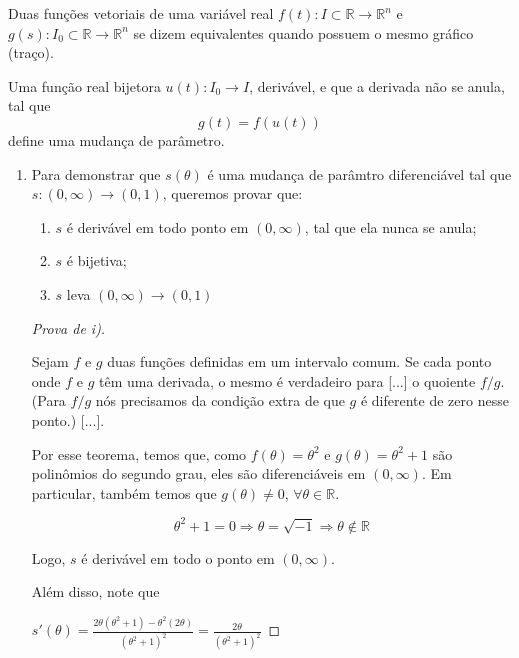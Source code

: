 \documentclass[../main.tex]{subfiles}
\begin{document}
\begin{solucao}
	\begin{definicao} 
		Duas funções vetoriais de uma variável real $f(t) : I\subset \mathbb{R}\rightarrow \mathbb{R}^n$ e $g(s) : I_{0} \subset \mathbb{R} \rightarrow \mathbb{R}^n$ se dizem equivalentes quando possuem o mesmo gráfico (traço).
		
		Uma função real bijetora $u(t) : I_{0}\rightarrow I$, derivável, e que a derivada não se anula, tal que
		$$g(t) = f(u(t))$$
		define uma mudança de parâmetro.
	\end{definicao}
	
	\begin{enumerate}[label=\alph*)]
		\item Para demonstrar que $s(\theta)$ é uma mudança de parâmtro diferenciável tal que $s:(0,\infty)\rightarrow(0,1)$, queremos provar que:
		
		\begin{enumerate}[label=\roman*)]
			\item $s$ é derivável em todo ponto em $(0,\infty)$, tal que ela nunca se anula;
			\item $s$ é bijetiva;
			\item $s$ leva $(0,\infty)\rightarrow(0,1)$ 
		\end{enumerate}
		
		\begin{proof}[Prova de i)]
			
			\begin{teorema}
				Sejam $f$ e $g$ duas funções definidas em um intervalo comum. Se cada ponto onde $f$ e $g$ têm uma derivada, o mesmo é verdadeiro para [...] o quoiente $f/g$. (Para $f/g$ nós precisamos da condição extra de que $g$ é diferente de zero nesse ponto.) [...].
			\end{teorema}
			
			Por esse teorema, temos que, como $f(\theta)=\theta^2$ e $g(\theta)=\theta^2+1$ são polinômios do segundo grau, eles são diferenciáveis em $(0,\infty)$. Em particular, também temos que $g(\theta)\neq 0$, $\forall \theta\in \mathbb{R}$.
			
			$$\theta^2+1=0\Rightarrow \theta=\sqrt{-1}\Rightarrow \theta\notin \mathbb{R}$$
			
			Logo, $s$ é derivável em todo o ponto em $(0,\infty)$.
			
			Além disso, note que
			
			$s'(\theta)=\frac{2\theta(\theta^2+1)-\theta^2(2\theta)}{(\theta^2+1)^2}=\frac{2\theta}{(\theta^2+1)^2}$
			

\end{proof}
\end{enumerate}
\end{solucao}
\end{document}

